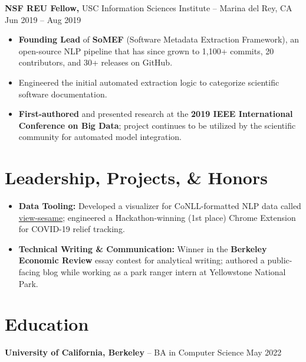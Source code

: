 \documentclass[11pt]{article}       %
\begin{document}
\textbf{NSF REU Fellow,} {USC Information Sciences Institute} -- Marina del Rey, CA \hfill Jun 2019 -- Aug 2019 \\
\vspace{-9pt}
\begin{itemize}
  \item \textbf{Founding Lead} of \textbf{SoMEF} (Software Metadata Extraction Framework), an open-source NLP pipeline 
  that has since grown to 1,100+ commits, 20 contributors, and 30+ releases on GitHub.
  \item Engineered the initial automated extraction logic to categorize scientific software documentation.
  \item \textbf{First-authored} and presented research at the \textbf{2019 IEEE International Conference on Big Data}; 
  project continues to be utilized by the scientific community for automated model integration.
\end{itemize}

\vspace{-18.5pt}

\section*{Leadership, Projects, \& Honors}
\begin{itemize}
  \item \textbf{Data Tooling:} Developed a visualizer for CoNLL-formatted NLP data called \href{https://github.com/citronella3alain/view-sesame}{view-sesame}; 
  engineered a Hackathon-winning (1st place) Chrome Extension for COVID-19 relief tracking.
  \item \textbf{Technical Writing \& Communication:} Winner in the \textbf{Berkeley Economic Review} essay 
  contest for analytical writing; authored a public-facing blog while working as a park ranger intern at Yellowstone National Park.
\end{itemize}

\vspace{-18.5pt}

\section*{Education}
\textbf{University of California, Berkeley} -- BA in Computer Science \hfill May 2022
\end{document}

